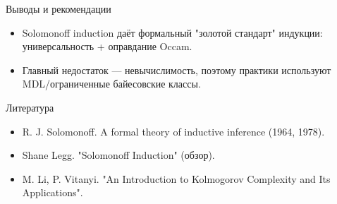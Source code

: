 \documentclass{beamer}
\begin{document}
\begin{frame}{Выводы и рекомендации}
  \begin{itemize}
    \item Solomonoff induction даёт формальный "золотой стандарт" индукции: универсальность + оправдание Occam.
    \item Главный недостаток — невычислимость, поэтому практики используют MDL/ограниченные байесовские классы.
  \end{itemize}
  
\end{frame}

\begin{frame}{Литература}
  \begin{itemize}
    \item R. J. Solomonoff. A formal theory of inductive inference (1964, 1978).
    \item Shane Legg. "Solomonoff Induction" (обзор).
    \item M. Li, P. Vitanyi. "An Introduction to Kolmogorov Complexity and Its Applications".
  \end{itemize}
\end{frame}
\end{document}
